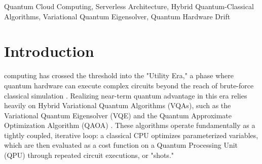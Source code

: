 \documentclass[conference]{IEEEtran}
\begin{document}
\maketitle
\begin{abstract}
As quantum computing enters the Utility Era, realizing near-term advantage relies heavily on Hybrid Variational Quantum Algorithms (VQAs). These algorithms require a tightly coupled, iterative loop between a classical CPU optimizer and a Quantum Processing Unit (QPU). However, current quantum cloud access models rely on decoupled batch-queues that sever this loop, introducing massive Time-to-Next-Shot (TTNS) latency. This delay not only inflates convergence time from minutes to hours but also exposes the computation to quantum hardware drift, degrading algorithmic fidelity and forcing costly system recalibrations. In this paper, we propose \textit{Entangled-FaaS}, a novel serverless middleware designed specifically for hybrid quantum workflows. Entangled-FaaS treats classical parameter optimization and quantum circuit execution as entangled, session-aware events. By implementing a Calibration-Aware placement strategy and a Dual-Resource Fair Queuing scheduler, our architecture routes circuits to QPUs with warm calibration caches and strictly prioritizes active iterative loops. Furthermore, we introduce the ``Quantum Future'' programming abstraction, enabling classical speculative execution to mask compute latency. Across the evaluated baselines, Entangled-FaaS achieves TTNS reductions of 15.3\%--94.3\%, QDC gains of 2.02--15.78 percentage points, and convergence speedups of 83.2\%--98.3\%, while eliminating drift penalties relative to Pilot-Quantum.
\end{abstract}

\begin{IEEEkeywords}
Quantum Cloud Computing, Serverless Architecture, Hybrid Quantum-Classical Algorithms, Variational Quantum Eigensolver, Quantum Hardware Drift
\end{IEEEkeywords}

\section{Introduction}
  computing has crossed the threshold into the "Utility Era," a phase where quantum hardware can execute complex circuits beyond the reach of brute-force classical simulation \cite{ibm_utility_2023,10967435}. Realizing near-term quantum advantage in this era relies heavily on Hybrid Variational Quantum Algorithms (VQAs), such as the Variational Quantum Eigensolver (VQE) and the Quantum Approximate Optimization Algorithm (QAOA) \cite{cerezo_vqa_2021,10967435}. These algorithms operate fundamentally as a tightly coupled, iterative loop: a classical CPU optimizes parameterized variables, which are then evaluated as a cost function on a Quantum Processing Unit (QPU) through repeated circuit executions, or "shots."
\end{document}
